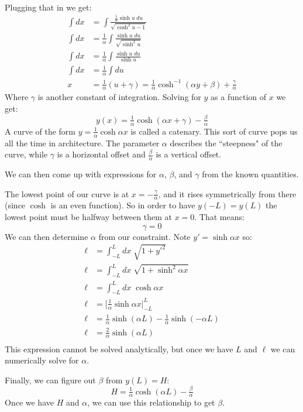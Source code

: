 \documentclass[12pt]{article}
\begin{document}
{\begin{align*}
\end{align*}
Plugging that in we get:
\begin{align*}
    \int dx &= \int \frac{\tfrac{1}{\alpha} \sinh u \; du}{ \sqrt{ \cosh^2 u - 1 } } \\
    \int dx &= \tfrac{1}{\alpha} \int \frac{ \sinh u \; du}{ \sqrt{ \sinh^2 u } } \\
    \int dx &= \tfrac{1}{\alpha} \int \frac{ \sinh u \; du}{ \sinh u } \\
    \int dx &= \tfrac{1}{\alpha} \int du \\
    x &= \tfrac{1}{\alpha} ( u + \gamma ) = \tfrac{1}{\alpha} \cosh^{-1} ( \alpha y + \beta ) + \tfrac{\gamma}{\alpha}
\end{align*}
Where $\gamma$ is another constant of integration. Solving for $y$ as a function of $x$ we get:
$$
y(x)= \tfrac{1}{\alpha} \cosh ( \alpha x + \gamma ) - \tfrac{\beta}{\alpha}
$$
A curve of the form $y = \tfrac{1}{\alpha} \cosh \alpha x$ is called a catenary. This sort of curve pops us all the time in architecture. The parameter $\alpha$ describes the ``steepness" of the curve, while $\gamma$ is a horizontal offset and $\tfrac{\beta}{\alpha}$ is a vertical offset. 

We can then come up with expressions for $\alpha$, $\beta$, and $\gamma$ from the known quantities.

The lowest point of our curve is at $x=-\tfrac{\gamma}{\alpha}$, and it rises symmetrically from there (since $\cosh$ is an even function). So in order to have $y(-L) = y(L)$ the lowest point must be halfway between them at $x=0$.  That means:
$$
\gamma=0
$$
We can then determine $\alpha$ from our constraint. Note $y' = \sinh \alpha x$ so:
\begin{align*}
    \ell &= \displaystyle \int_{-L}^L dx \; \sqrt{1 + y'^2} \\
    \ell &= \displaystyle \int_{-L}^L dx \; \sqrt{1 + \sinh^2 \alpha x} \\
    \ell &= \displaystyle \int_{-L}^L dx \; \cosh \alpha x \\
    \ell &= \Big[ \tfrac{1}{\alpha} \sinh \alpha x \Big|_{-L}^L \\
    \ell &= \tfrac{1}{\alpha} \sinh ( \alpha L ) - \tfrac{1}{\alpha} \sinh ( -\alpha L )\\      
    \ell &= \tfrac{2}{\alpha} \sinh (\alpha L) \\
\end{align*}
This expression cannot be solved analytically, but once we have $L$ and $\ell$ we can numerically solve for $\alpha$.

Finally, we can figure out $\beta$ from $y(L) = H$:
$$
H = \tfrac{1}{\alpha} \cosh ( \alpha L ) - \tfrac{\beta}{\alpha}
$$
Once we have $H$ and $\alpha$, we can use this relationship to get $\beta$.
}
\end{document}
